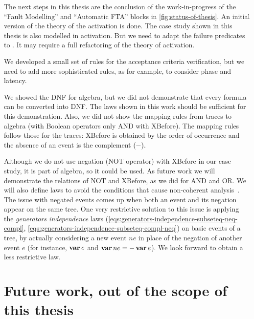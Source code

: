 \documentclass[12pt,openright,twoside,a4paper,oldfontcommands,english,brazil,final]{abntex2}
\theoremstyle{theo}
\newcommand{\distinctlist}{%
  distinct list\footnote{Although some may use the terminology ``disjoint list'' to call a list of non-repeated elements, we use the same terminology (distinct list) of the theories built-in the \isabellehol tool.}%
  \global\renewcommand{\distinctlist}{distinct list}%
  \global\renewcommand{\distinctlists}{distinct lists}%
}
\newcommand{\distinctlists}{%
  distinct lists\footnote{Although some may use the terminology ``disjoint lists'' to call the lists of non-repeated elements, we use the same terminology (distinct lists) of the theories built-in the \isabellehol tool.}%
  \global\renewcommand{\distinctlist}{distinct list\xspace}%
  \global\renewcommand{\distinctlists}{distinct lists\xspace}%
  \xspace%
}
\newcommand{\isabellehol}[1][]{%
  Isabelle/HOL{#1}\index{Isabelle/HOL}~2015\footnote{The 2002 tutorial is reported in~\cite{NPW2002}, but there is a newer version published with the tool itself.
  The tool and the tutorial are available on their website at \url{http://isabelle.in.tum.de}.}%
  \global\renewcommand{\isabellehol}[1][]{Isabelle/HOL{#1}\index{Isabelle/HOL}\xspace}\xspace %
}
\def\varop{\ensuremath\operatorname{\mathbf{var}}}
\newcommand{\var}[1]{\ensuremath\varop #1}
\begin{document}
The next steps in this thesis are the conclusion of the work-in-progress of the ``Fault Modelling'' and ``Automatic FTA'' blocks in \cref{fig:status-of-thesis}.
An initial version of the theory of the \ac{activation} is done.
The case study shown in this thesis is also modelled in \ac{activation}.
But we need to adapt the failure predicates to .
It may require a full refactoring of the theory of \ac{activation}.

We developed a small set of rules for the acceptance criteria verification, but we need to add more sophisticated rules, as for example, to consider phase and latency.

We showed the \ac{DNF} for \ac{algebra}, but we did not demonstrate that every formula can be converted into \ac{DNF}.
The laws shown in this work should be sufficient for this demonstration.
Also, we did not show the mapping rules from traces to \ac{algebra} (with Boolean operators only \ac{AND} with \ac{XBefore}).
The mapping rules follow those for the traces: \ac{XBefore} is obtained by the order of occurrence and the absence of an event is the complement ($-$).

Although we do not use negation (\ac{NOT} operator) with \ac{XBefore} in our case study, it is part of \ac{algebra}, so it could be used.
As future work we will demonstrate the relations of \ac{NOT} and \ac{XBefore}, as we did for \ac{AND} and \ac{OR}.
We will also define laws to avoid the conditions that cause non-coherent analysis~\cite{Oliv2006}.
The issue with negated events comes up when both an event and its negation appear on the same tree.
One very restrictive solution to this issue is applying the \emph{generators independence} laws (\ref{eqs:generators-independence-subseteq-neq-compl}, \ref{eqs:generators-independence-subseteq-compl-neq}) on basic events of a tree, by actually considering a new event $ne$ in place of the negation of another event $e$ (for instance, $\var e$ and $\var ne = -\var e$).
We look forward to obtain a less restrictive law.


\section{Future work, out of the scope of this thesis}

\end{document}
